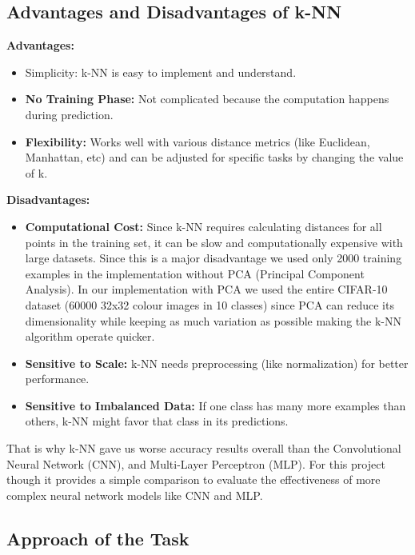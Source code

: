 \documentclass[lettersize,journal]{IEEEtran}
\begin{document}
\subsection{\textbf{Advantages and Disadvantages of k-NN}}

\textbf{Advantages:}
\begin{itemize}
    \item \textbf{}{Simplicity:} k-NN is easy to implement and understand.
    \item \textbf{No Training Phase:} Not complicated because the computation happens during prediction.
    \item \textbf{Flexibility:} Works well with various distance metrics (like Euclidean, Manhattan, etc) and can be adjusted for specific tasks by changing the value of k.
\end{itemize}

\textbf{Disadvantages:}
\begin{itemize}
    \item \textbf{Computational Cost:} Since k-NN requires calculating distances for all points in the training set, it can be slow and computationally expensive with large datasets. Since this is a major disadvantage we used only 2000 training examples in the implementation without PCA (Principal Component Analysis). In our implementation with PCA we used the entire CIFAR-10 dataset (60000 32x32 colour images in 10 classes) since PCA can reduce its dimensionality while keeping as much variation as possible making the k-NN algorithm operate quicker.
    \item \textbf{Sensitive to Scale:} k-NN needs preprocessing (like normalization) for better performance.
    \item \textbf{Sensitive to Imbalanced Data:} If one class has many more examples than others, k-NN might favor that class in its predictions.
\end{itemize}
\vspace{0.3cm}

That is why k-NN gave us worse accuracy results overall than the Convolutional Neural Network (CNN), and Multi-Layer Perceptron (MLP).
For this project though it provides a simple comparison to evaluate the effectiveness of more complex neural network models like CNN and MLP.

\subsection{\textbf{Approach of the Task}}
\end{document}
